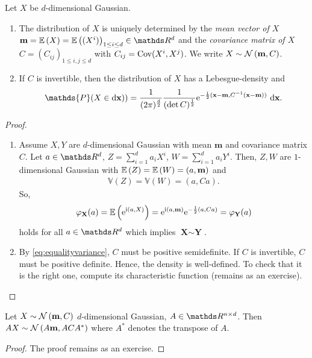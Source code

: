 \begin{thm}
Let $X$ be $d$-dimensional Gaussian.
\begin{enumerate}[label=(\alph*)]
\item The distribution of $X$ is uniquely determined by the \emph{mean vector of $X$} $\textbf{m}=\E{X}=\E{(X^i)}_{1\leq i\leq d} \in \Rd$ and the \emph{covariance matrix of $X$} $C=(C_{ij})_{1\leq i,j\leq d}$ with $C_{ij}=\operatorname{Cov}(X^i,X^j)$.
We write $X \sim \mathcal{N}\left(\textbf{m},C\right)$.
\item If $C$ is invertible, then the distribution of $X$ has a Lebesgue-density and
\begin{align*}
\mathds{P}(X \in \mathrm{d}\textbf{x}))=\frac{1}{(2 \pi)^{\frac{d}{2}}} \frac{1}{(\det C)^{\frac{1}{2}}} \e^{-\frac{1}{2}(\textbf{x}-\textbf{m},C^{-1}(\textbf{x}-\textbf{m}))}~\mathrm{d}\textbf{x}.
\end{align*}
\end{enumerate}
\begin{proof}
\begin{enumerate}[label=(\alph*)]
\item Assume $X,Y$ are $d$-dimensional Gaussian with mean $\textbf{m}$ and covariance matrix $C$.
Let $a\in \Rd$, $Z=\sum_{i=1}^d a_iX^i$, $W=\sum_{i=1}^d a_i Y^i$.
Then, $Z,W$ are $1$-dimensional Gaussian with $\mathbb{E}\left(Z\right)=\mathbb{E}\left(W\right)=(a,\textbf{m})$ and
\begin{align}\label{eq:equalityvariance}
\mathds{V}(Z)=\mathds{V}(W)=(a,Ca).
\end{align}
So,
\begin{align*}
\varphi_{\textbf{X}}(a)=\mathbb{E}\left(\mathrm{e}^{\mathrm{i} (a,X)}\right)=\mathrm{e}^{\mathrm{i} (a,\textbf{m})}\mathrm{e}^{-\frac{1}{2}(a,Ca)}=\varphi_\textbf{Y}(a)
\end{align*}
holds for all $a\in\Rd$ which implies $\textbf{X}\sim \textbf{Y}$.
\item By \eqref{eq:equalityvariance}, $C$ must be positive semidefinite. If $C$ is invertible, $C$ must be positive definite.
Hence, the density is well-defined.
To check that it is the right one, compute its characteristic function (remains as an exercise). \qedhere
\end{enumerate}
\end{proof}
\end{thm}

\begin{prop}
Let $X \sim \mathcal{N}\left(\textbf{m},C\right)$ $d$-dimensional Gaussian, $A \in \R^{n\times d}$.
Then $AX\sim \mathcal{N}\left(A\textbf{m},ACA^\ast\right)$ where $A^\ast$ denotes the transpose of $A$.
\begin{proof}
The proof remains as an exercise.
\end{proof}
\end{prop}

